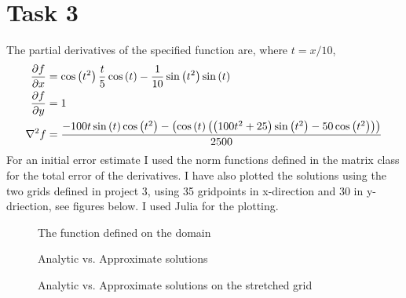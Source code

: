 \documentclass{setup}
\begin{document}
\section{Task 3}
The partial derivatives of the specified function are, where $t=x/10$,
\begin{align}
    \frac{\partial f}{\partial x} &= \cos\left(t^2\right)\frac{t}{5} \cos\left(t\right) - \frac{1}{10}\sin\left(t^2\right)\sin\left(t\right)
    \\
    \frac{\partial f}{\partial y} &= 1
    \\
    \nabla^2 f &= \frac{-100t\sin\left(t\right)\cos\left(t^2\right) - \left(\cos\left(t\right)\left(\left(100t^2+25\right)\sin\left(t^2\right)-50\cos\left(t^2\right) \right)\right)} {2500}
\end{align}
For an initial error estimate I used the norm functions defined in the matrix class for the total error of the derivatives. I have also plotted the solutions using the two grids
defined in project 3, using 35 gridpoints in x-direction and 30 in y-driection, see figures below. I used Julia for the plotting.
\begin{figure}[H]
    \centering
    \caption{The function defined on the domain}
\end{figure}
\begin{figure}[H]
    \centering
    \subfigure[Exact $u_x$]{
        \centering
        
    }
    \subfigure[Approximated $u_x$]{
        \centering
        
    }
    \subfigure[Exact $u_y$]{
        \centering
        
    }
    \subfigure[Approximated $u_y$]{
        \centering
        
    }
    \caption{Analytic vs. Approximate solutions}
\end{figure}
\begin{figure}[H]
    \centering
    \subfigure[Exact $u_x$]{
        \centering
        
    }
    \subfigure[Approximated $u_x$]{
        \centering
        
    }
    \subfigure[Exact $u_y$]{
        \centering
        
    }
    \subfigure[Approximated $u_y$]{
        \centering
        
    }
    \caption{Analytic vs. Approximate solutions on the stretched grid}
\end{figure}
\newpage
\end{document}
